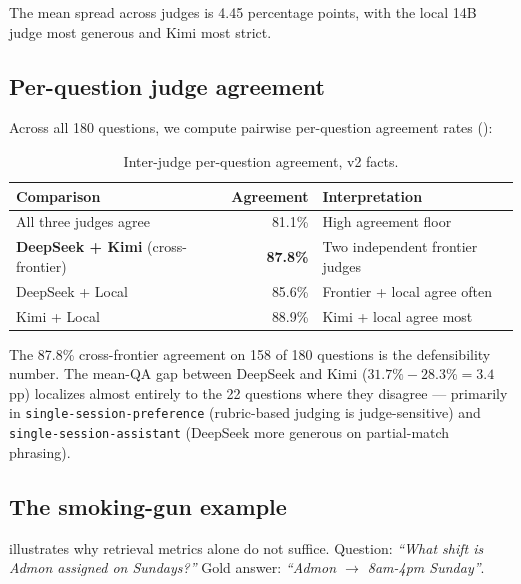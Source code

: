 \documentclass{article}
\begin{document}
The mean spread across judges is 4.45 percentage points, with the local 14B judge most generous and Kimi most strict.

\subsection{Per-question judge agreement}

Across all 180 questions, we compute pairwise per-question agreement rates ():

\begin{table}[h]
\centering
\small
\caption{Inter-judge per-question agreement, v2 facts.}
\label{tab:agreement}
\begin{tabular}{lrl}
\toprule
Comparison                          & Agreement & Interpretation \\
\midrule
All three judges agree              & 81.1\%    & High agreement floor \\
\textbf{DeepSeek + Kimi} (cross-frontier) & \textbf{87.8\%} & Two independent frontier judges \\
DeepSeek + Local                    & 85.6\%    & Frontier + local agree often \\
Kimi + Local                        & 88.9\%    & Kimi + local agree most \\
\bottomrule
\end{tabular}
\end{table}

The 87.8\% cross-frontier agreement on 158 of 180 questions is the defensibility number. The mean-QA gap between DeepSeek and Kimi ($31.7\% - 28.3\% = 3.4$\,pp) localizes almost entirely to the 22 questions where they disagree --- primarily in \texttt{single-session-preference} (rubric-based judging is judge-sensitive) and \texttt{single-session-assistant} (DeepSeek more generous on partial-match phrasing).

\subsection{The smoking-gun example}

 illustrates why retrieval metrics alone do not suffice. Question: \emph{``What shift is Admon assigned on Sundays?''} Gold answer: \emph{``Admon $\to$ 8am-4pm Sunday''}.
\end{document}
